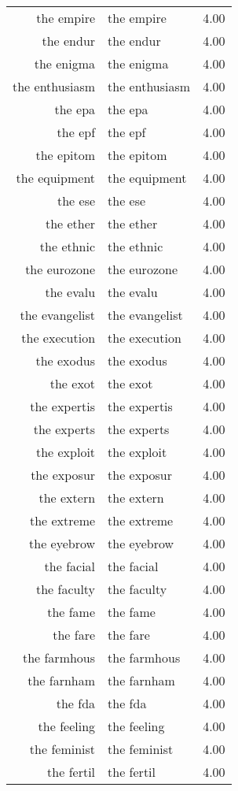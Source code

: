 \begin{table}[ht]
\begin{tabular}{rlr}
  the empire & the empire & 4.00 \\ 
  the endur & the endur & 4.00 \\ 
  the enigma & the enigma & 4.00 \\ 
  the enthusiasm & the enthusiasm & 4.00 \\ 
  the epa & the epa & 4.00 \\ 
  the epf & the epf & 4.00 \\ 
  the epitom & the epitom & 4.00 \\ 
  the equipment & the equipment & 4.00 \\ 
  the ese & the ese & 4.00 \\ 
  the ether & the ether & 4.00 \\ 
  the ethnic & the ethnic & 4.00 \\ 
  the eurozone & the eurozone & 4.00 \\ 
  the evalu & the evalu & 4.00 \\ 
  the evangelist & the evangelist & 4.00 \\ 
  the execution & the execution & 4.00 \\ 
  the exodus & the exodus & 4.00 \\ 
  the exot & the exot & 4.00 \\ 
  the expertis & the expertis & 4.00 \\ 
  the experts & the experts & 4.00 \\ 
  the exploit & the exploit & 4.00 \\ 
  the exposur & the exposur & 4.00 \\ 
  the extern & the extern & 4.00 \\ 
  the extreme & the extreme & 4.00 \\ 
  the eyebrow & the eyebrow & 4.00 \\ 
  the facial & the facial & 4.00 \\ 
  the faculty & the faculty & 4.00 \\ 
  the fame & the fame & 4.00 \\ 
  the fare & the fare & 4.00 \\ 
  the farmhous & the farmhous & 4.00 \\ 
  the farnham & the farnham & 4.00 \\ 
  the fda & the fda & 4.00 \\ 
  the feeling & the feeling & 4.00 \\ 
  the feminist & the feminist & 4.00 \\ 
  the fertil & the fertil & 4.00 \\ 

\end{tabular}
\end{table}
